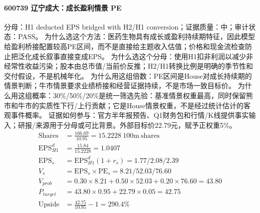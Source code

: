 \paragraph{600739 辽宁成大：成长盈利情景 PE}
分母：H1 deducted EPS bridged with H2/H1 conversion；证据质量：中；审计状态：PASS。
为什么选这个方法：医药生物具有成长或盈利持续期特征，因此模型给盈利桥接配置较高PE区间，而不是直接给主题收入估值；价格和现金流检查防止把泛化成长叙事直接变成EPS。
为什么选这个分母：使用H1扣非利润以减少非经常性收益污染；股本由总市值/当前价反推；H2/H1转换比例是明确的季节性和交付假设，不是机械年化。
为什么用这组倍数：PE区间是House对成长持续期的情景判断；牛市情景要求业绩桥接和经营证据持续，不是市场一致目标价。
为什么用这组概率：30\%/50\%/20\%是统一筛选先验：基准情景权重最高，同时保留熊市和牛市的实质性下行/上行贡献；它是House情景权重，不是经过统计估计的客观事件概率。
证据如何参与：官方半年报预告、Q1财务包和行情/K线提供事实输入；研报/来源用于分母或可比背景。外部目标价22.79元，赋予正权重5\%。
\begin{align*}
\mathrm{Shares} &= \frac{166.69}{10.95}=15.2228\ \mathrm{100m\ shares}\\
\mathrm{EPS}_{H1}^d &= \frac{15.84}{15.2228}=1.0407\\
\mathrm{EPS}_s &= \mathrm{EPS}_{H1}^d(1+r_s)=1.77/2.08/2.39\\
V_s &= \mathrm{EPS}_s\times \mathrm{PE}_s=8.21/52.03/76.60\\
V_{prob} &= 0.30\times 8.21+0.50\times 52.03+0.20\times 76.60=43.80\\
P_{target} &= 43.80\times 0.95+22.79\times 0.05=42.75\\
\mathrm{Upside} &= \frac{42.75}{10.95}-1=290.4\%\\
\end{align*}

